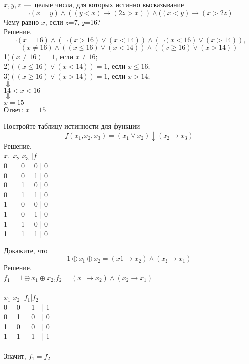 
\setcounter{example}{0}

\begin{exercise}
$x, y, z$~---~целые числа,  для которых истинно высказывание
$$\neg(x=y)\wedge((y<x)\rightarrow(2z>x))\wedge((x<y)\rightarrow(x>2z)$$
Чему равно $x$, если $z$=7, $y$=16?\\
Решение.
$$\neg(x=16)\wedge(\neg(x>16)\vee(x<14))\wedge(\neg(x<16)\vee(x>14)),$$
$$(x\neq16)\wedge((x\leqslant16)\vee(x<14))\wedge((x\geqslant16)\vee(x>14))$$
1)$(x\neq16)=1$, если $x\neq16$;\\
2)$((x\leqslant16)\vee(x<14))=1$, если $x\leqslant16$;\\
3)$((x\geqslant16)\vee(x>14))=1$, если $x>14$;\\
$ \Downarrow$\\
$14<x<16$\\
$ \Downarrow$\\
$x=15$\\
Ответ: $x=15$
\end{exercise}

\begin{exercise}
Постройте таблицу истинности для функции
$$f(x_1,x_2,x_3)=(x_1\vee x_2)\downarrow(x_2\rightarrow x_3)$$
Решение.\\
$x_1$ $x_2$ $x_3$ |$f$\\
0\ \ \ \  0 \ \   0 | 0\\
0\ \ \ \  0 \ \   1 | 0\\
0\ \ \ \  1 \ \   0 | 0\\
0\ \ \ \  1 \ \   1 | 0\\
1\ \ \ \  0 \ \   0 | 0\\
1\ \ \ \  0 \ \   1 | 0\\
1\ \ \ \  1 \ \   0 | 0\\
1\ \ \ \  1 \ \   1 | 0\\
\end{exercise}

\begin{exercise}
Докажите, что 
$$1\oplus x_1\oplus x_2=(x1\rightarrow x_2)\wedge(x_2\rightarrow x_1)$$
Решение.\\
$f_1=1\oplus x_1\oplus x_2$,$f_2=(x1\rightarrow x_2)\wedge(x_2\rightarrow x_1)$\\
\\
$x_1$ $x_2$ |$f_1$|$f_2$\\
0 \ \   0\ \ | 1\ \ | 1 \\
0 \ \   1\ \ | 0\ \ | 0\\
1 \ \   0\ \ | 0\ \ | 0\\
1 \ \   1\ \ | 1\ \ |  1\\
\\
Значит, $f_1=f_2$
\end{exercise}

